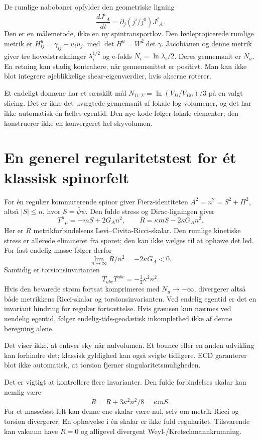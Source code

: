 \documentclass[11pt,a4paper]{article}
\begin{document}
De rumlige nabobaner opfylder den geometriske ligning
\[
 \frac{dJ^i{}_A}{dt}=\partial_j(j^i/j^0)J^j{}_A.
\]
Den er en målemetode, ikke en ny spintransportlov. Den hvileprojicerede rumlige metrik er $H^u_{ij}=\gamma_{ij}+u_i u_j$, med $\det H^u=W^2\det\gamma$. Jacobianen og denne metrik giver tre hovedstrækninger $\lambda_i^{1/2}$ og e-folds $N_i=\ln\lambda_i/2$. Deres gennemsnit er $N_u$. En retning kan stadig kontrahere, når gennemsnittet er positivt. Man kan ikke blot integrere øjeblikkelige shear-eigenværdier, hvis akserne roterer.

Et endeligt domæne har et særskilt mål $N_{D,\Sigma}=\ln(V_D/V_{D0})/3$ på en valgt slicing. Det er ikke det uvægtede gennemsnit af lokale log-volumener, og det har ikke automatisk én fælles egentid. Den nye kode følger lokale elementer; den konstruerer ikke en konvergeret hel skyvolumen.

\section{En generel regularitetstest for ét klassisk spinorfelt}
For én regulær kommuterende spinor giver Fierz-identiteten $A^2=n^2=S^2+\Pi^2$, altså $|S|\leq n$, hvor $S=\bar\psi\psi$. Den fulde stress og Dirac-ligningen giver
\[
 T^\mu{}_{\mu}=-mS+2G_A n^2,\qquad
 \boxed{R=\kappa mS-2\kappa G_A n^2.}
\]
Her er $R$ metrikforbindelsens Levi--Civita-Ricci-skalar. Den rumlige kinetiske stress er allerede elimineret fra sporet; den kan ikke vælges til at ophæve det led. For fast endelig masse følger derfor
\[
 \lim_{n\to\infty}R/n^2=-2\kappa G_A<0.
\]
Samtidig er torsionsinvarianten
\[
 T_{abc}T^{abc}=-\tfrac32\kappa^2n^2.
\]
Hvis den bevarede strøm fortsat komprimeres med $N_u\to-\infty$, divergerer altså både metrikkens Ricci-skalar og torsionsinvarianten. Ved endelig egentid er det en invariant hindring for regulær fortsættelse. Hvis grænsen kun nærmes ved uendelig egentid, følger endelig-tids-geodætisk inkomplethed ikke af denne beregning alene.

Det viser ikke, at enhver sky når nulvolumen. Et bounce eller en anden udvikling kan forhindre det; klassisk gyldighed kan også svigte tidligere. ECD garanterer blot ikke automatisk, at torsion fjerner singularitetsmuligheden.

Det er vigtigt at kontrollere flere invarianter. Den fulde forbindelses skalar kan nemlig være
\[
 \widetilde R=R+3\kappa^2n^2/8=\kappa mS.
\]
For et masseløst felt kan denne ene skalar være nul, selv om metrik-Ricci og torsion divergerer. En ophævelse i én skalar er ikke fuld regularitet. Tilsvarende kan vakuum have $R=0$ og alligevel divergent Weyl-/Kretschmannkrumning.
\end{document}
